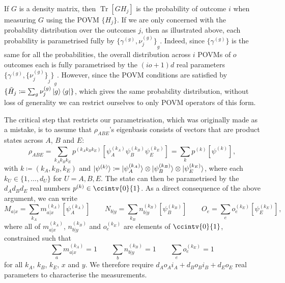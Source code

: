 \documentclass[10pt, a4paper]{article}
\numberwithin{equation}{section} %
\theoremstyle{definition}
\theoremstyle{plain}
\newcommand{\dintv}[2]{\mathopen\{#1,\ldots,#2\mathclose\}}
\newcommand{\?}{\mathrel{?}} %
\newcommand{\Tr}[2][]{\mathop{\mathrm{Tr}#1}\left[ #2 \right]} %
\newcommand{\proj}[2][]{{[#2]}_{#1}}
\begin{document}
\begin{appendices}
                    If \(G\) is a density matrix, then \(\Tr{GH_j}\) is the probability of outcome \(i\) when measuring \(G\) using the POVM \(\{H_j\}\). If we are only concerned with the probability distribution over the outcomes \(j\), then as illustrated above, each probability is parametrised fully by \({\{\gamma^{(g)}, \nu^{(g)}_j\}}_{g}\). Indeed, since \(\{\gamma^{(g)}\}\) is the same for all the probabilities, the overall distribution across \(i\) POVMs of \(o\) outcomes each is fully parametrised by the \((io+1)d\) real parameters \({\{\gamma^{(g)}, {\{\nu^{(g)}_j\}}_j \}}_{g}\). However, since the POVM conditions are satisfied by \(\{\tilde{H}_j \coloneqq \sum_g \nu^{(g)}_j \ket{g}\bra{g}\}\), which gives the same probability distribution, without loss of generality we can restrict ourselves to only POVM operators of this form.

                      The critical step that restricts our parametrisation, which was originally made as a mistake, is to assume that \(\rho_{ABE}\)'s eigenbasis consists of vectors that are product states across \(A\), \(B\) and \(E\):
                      \begin{equation}
                        \rho_{ABE} = \sum_{k_A k_B k_E} p^{(k_A k_B k_E)} \proj{\psi_A^{(k_A)} \psi_B^{(k_B)} \psi_E^{(k_E)}} = \sum_{k} p^{(k)} \proj{\psi^{(k)}},
                      \end{equation}
                      with \(k \coloneqq (k_A, k_B, k_E)\) and \(\ket{\psi^{(k)}} \coloneqq \ket{\psi_A^{(k_A)}} \otimes \ket{\psi_B^{(k_B)}} \otimes \ket{\psi_E^{(k_E)}}\), where each \(k_U \in \dintv{1}{d_U}\) for \(U = A,B,E\). The state can then be parametrised by the \(d_A d_B d_E\) real numbers \(p^{(k)} \in \ccintv{0}{1}\). As a direct consequence of the above argument, we can write
                      \begin{equation}
                        M_{a|x} = \sum_{k_A} m_{a|x}^{(k_A)} \proj{\psi_A^{(k_A)}} \qquad N_{b|y} = \sum_{k_B} n_{b|y}^{(k_B)} \proj{\psi_B^{(k_B)}} \qquad O_{e} = \sum_{e} o_{e}^{(k_E)} \proj{\psi_E^{(k_E)}},
                      \end{equation}
                      where all of \(m_{a|x}^{(k_A)}\), \(n_{b|y}^{(k_B)}\) and \(o_{e}^{(k_E)}\) are elements of \(\ccintv{0}{1}\), constrained such that
                      \begin{equation}
                        \sum_{a} m_{a|x}^{(k_A)} = 1 \qquad \sum_{b} n_{b|y}^{(k_B)} = 1 \qquad \sum_{e} o_e^{(k_E)} = 1
                      \end{equation}
                      for all \(k_A\), \(k_B\), \(k_E\), \(x\) and \(y\). We therefore require \(d_A o_A i_A + d_B o_B i_B + d_E o_E\) real parameters to characterise the measurements.


\end{appendices}
\end{document}
